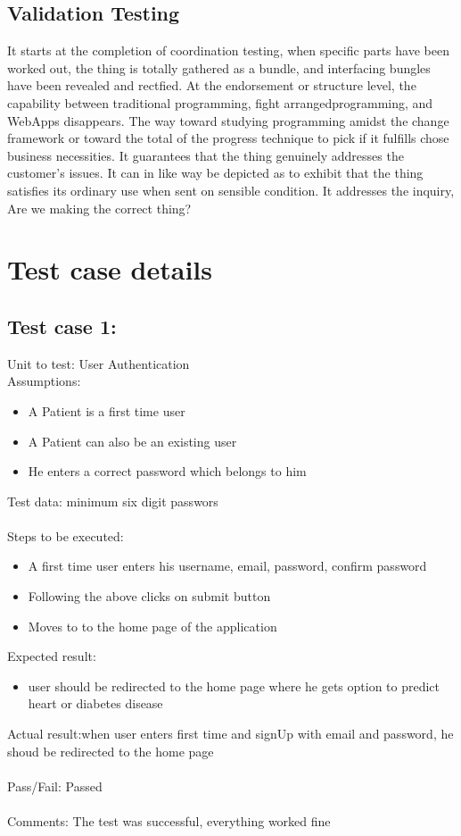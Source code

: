 \documentclass[oneside,12pt]{Classes/VTU}
\begin{document}
	\subsection{Validation Testing}
	It starts at the completion of coordination testing, when specific parts have been worked out, the thing is totally gathered as a bundle, and interfacing bungles have been revealed and rectfied. At the endorsement or structure level, the capability between traditional programming, fight arrangedprogramming, and WebApps disappears. The way toward studying programming amidst the change framework or toward the total of the progress technique to pick if it fulfills chose business necessities. It guarantees that the thing genuinely addresses the customer's issues. It can in like way be depicted as to exhibit that the thing satisfies its ordinary use when sent on sensible condition. It addresses the inquiry, Are we making the correct thing?
	
		\section{Test case details}
	\subsection{Test case 1:}
	Unit to test: User Authentication\\
	Assumptions:\\
	\begin{itemize}
		\item A Patient is a first time user
		\item A Patient can also be an existing user
		\item He enters a correct password which belongs to him
	\end{itemize}
	Test data: minimum six digit passwors\\
	\\
	Steps to be executed:
	\begin{itemize}
		\item A first time user enters his username, email, password, confirm password
		\item Following the above clicks on submit button
		\item Moves to to the home page of the application
	\end{itemize}
	Expected result:
	\begin{itemize}
		\item user should be redirected to the home page where he gets option to predict heart or diabetes disease
	\end{itemize}
	Actual result:when user enters first time and signUp with email and password, he shoud be redirected to the home page\\
	\\
	Pass/Fail: Passed\\
	\\
	Comments:  The test was successful, everything worked fine
	
\end{document}
